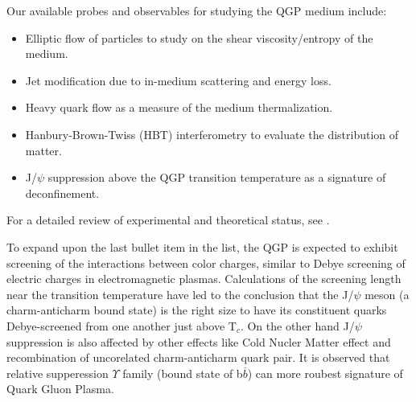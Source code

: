 Our available probes and observables for studying the QGP medium include:
\begin{itemize}
 \item Elliptic flow of particles to study on the shear viscosity/entropy of the medium.
 \item Jet modification due to in-medium scattering and energy loss.
 \item Heavy quark flow as a measure of the medium thermalization.
 \item Hanbury-Brown-Twiss (HBT) interferometry to evaluate the distribution of matter.
 \item J/$\psi$ suppression above the QGP transition temperature as a signature of deconfinement.
 \end{itemize}

For a detailed review of experimental and theoretical status, see \cite{QGPThRev,QGPExpRev}.


To expand upon the last bullet item in the list, the QGP is expected to exhibit screening of the
interactions between color charges, similar to Debye screening of electric charges in electromagnetic
plasmas. Calculations of the screening length near the transition temperature have led to the
conclusion that the J/$\psi$  meson (a charm-anticharm bound state) is the right size to have its
constituent quarks Debye-screened from one another just above T$_c$. On the other hand  J/$\psi$ 
suppression is also affected by other effects like Cold Nucler Matter effect and recombination of
uncorelated charm-anticharm quark pair. It is observed that relative supperession $\Upsilon$ family
(bound state of b$\overline{b}$) can more roubest signature of Quark Gluon Plasma.  
 









